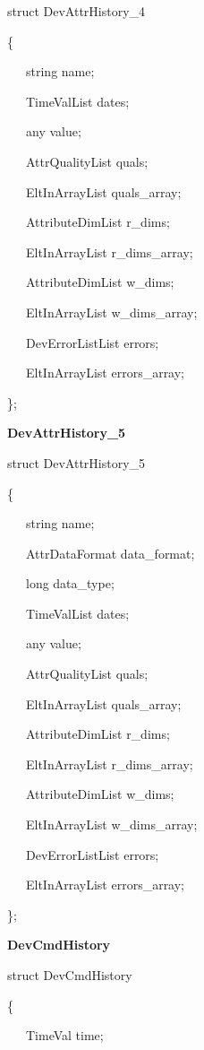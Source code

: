 struct DevAttrHistory\_4

\{

~~~string name;

~~~TimeValList dates;

~~~any value;

~~~AttrQualityList quals;

~~~EltInArrayList quals\_array;

~~~AttributeDimList r\_dims;

~~~EltInArrayList r\_dims\_array;

~~~AttributeDimList w\_dims;

~~~EltInArrayList w\_dims\_array;

~~~DevErrorListList errors;

~~~EltInArrayList errors\_array;

\};\\


\begin{flushleft}
\textbf{DevAttrHistory\_5}
\par\end{flushleft}

struct DevAttrHistory\_5

\{

~~~string name;

~~~AttrDataFormat data\_format;

~~~long data\_type;

~~~TimeValList dates;

~~~any value;

~~~AttrQualityList quals;

~~~EltInArrayList quals\_array;

~~~AttributeDimList r\_dims;

~~~EltInArrayList r\_dims\_array;

~~~AttributeDimList w\_dims;

~~~EltInArrayList w\_dims\_array;

~~~DevErrorListList errors;

~~~EltInArrayList errors\_array;

\};\\


\begin{flushleft}
\textbf{DevCmdHistory}
\par\end{flushleft}

struct DevCmdHistory

\{

~~~TimeVal time;

